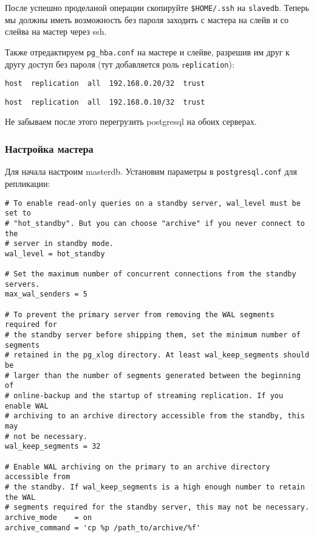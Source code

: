 После успешно проделаной операции скопируйте \lstinline!$HOME/.ssh! на \lstinline!slavedb!. Теперь мы должны иметь возможность без пароля заходить с мастера на слейв и со слейва на мастер через ssh.

Также отредактируем \lstinline!pg_hba.conf! на мастере и слейве, разрешив им друг к другу доступ без пароля (тут добавляется роль r\lstinline!eplication!):

\begin{lstlisting}[label=lst:streaming7,caption=Мастер pg\_hba.conf]
host  replication  all  192.168.0.20/32  trust
\end{lstlisting}

\begin{lstlisting}[label=lst:streaming8,caption=Слейв pg\_hba.conf]
host  replication  all  192.168.0.10/32  trust
\end{lstlisting}

Не забываем после этого перегрузить postgresql на обоих серверах.

\subsubsection{Настройка мастера}

Для начала настроим masterdb. Установим параметры в \lstinline!postgresql.conf! для репликации:

\begin{lstlisting}[label=lst:streaming9,caption=Настройка мастера]
# To enable read-only queries on a standby server, wal_level must be set to
# "hot_standby". But you can choose "archive" if you never connect to the
# server in standby mode.
wal_level = hot_standby

# Set the maximum number of concurrent connections from the standby servers.
max_wal_senders = 5

# To prevent the primary server from removing the WAL segments required for
# the standby server before shipping them, set the minimum number of segments
# retained in the pg_xlog directory. At least wal_keep_segments should be
# larger than the number of segments generated between the beginning of
# online-backup and the startup of streaming replication. If you enable WAL
# archiving to an archive directory accessible from the standby, this may
# not be necessary.
wal_keep_segments = 32

# Enable WAL archiving on the primary to an archive directory accessible from
# the standby. If wal_keep_segments is a high enough number to retain the WAL
# segments required for the standby server, this may not be necessary.
archive_mode    = on
archive_command = 'cp %p /path_to/archive/%f'
\end{lstlisting}

